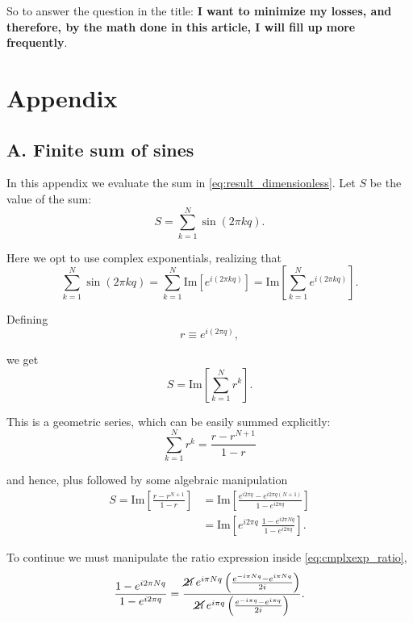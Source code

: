\documentclass[11pt]{article}
\begin{document}
\par 
So to answer the question in the title: \textbf{I want to minimize my losses, and therefore, by the math done in this article, I will fill up more frequently}.


\section*{Appendix}

\subsection*{A. Finite sum of sines}
\label{subsec:sine_sum}

\renewcommand{\theequation}{A.\arabic{equation}}
\renewcommand{\Im}[1]{\text{Im}\left[{#1}\right]}
\renewcommand{\exp}[1]{e^{#1}}
In this appendix we evaluate the sum in \eqref{eq:result_dimensionless}. Let $S$ be the value of the sum:
\begin{equation}
S = \sum_{k=1}^{N} \sin (2 \pi k q).
\end{equation}

Here we opt to use complex exponentials, realizing that
\begin{equation}
\sum_{k=1}^{N} \sin (2 \pi k q) = \sum_{k=1}^{N} \Im{\exp{i(2 \pi k q)}} = \Im{\sum_{k=1}^{N} \exp{i(2 \pi k q)}}.
\end{equation}

Defining
$$
r \equiv e^{i(2 \pi q)},
$$

we get
\begin{equation}
S = \Im{\sum_{k=1}^{N} r^{k}}.
\end{equation}

This is a geometric series, which can be easily summed explicitly:
\begin{equation}
\sum_{k=1}^{N} r^{k} = \frac{r - r^{N+1}}{1 - r}
\end{equation}

and hence, plus followed by some algebraic manipulation
\begin{align}
S = \Im{\frac{r - r^{N+1}}{1 - r}} &= \Im{\frac{\exp{i 2\pi q} - \exp{i 2\pi q (N+1)}}{1 - \exp{i 2\pi q}}} \nonumber \\[0.4em]
 &= \Im{\exp{i 2\pi q} \: \frac{1 - \exp{i 2\pi Nq}}{1 - \exp{i 2\pi q}}}. \label{eq:cmplxexp_ratio}
\end{align}

To continue we must manipulate the ratio expression inside \eqref{eq:cmplxexp_ratio},
$$
\frac{1 - \exp{i 2\pi Nq}}{1 - \exp{i 2 \pi q}} = 
\frac{\cancel{2i} \: \exp{i \pi Nq}\left(\frac{\exp{-i\pi Nq} - \exp{i\pi Nq}}{2i}\right)}{\cancel{2i} \: \exp{i\pi q} \left( \frac{\exp{-i\pi q} - \exp{i\pi q}}{2i}\right)}.
$$
\end{document}
